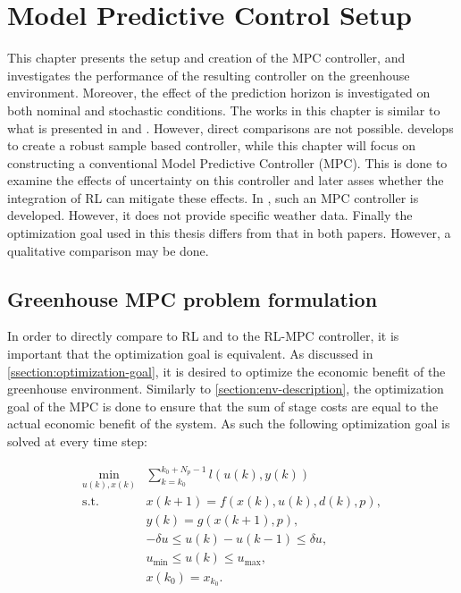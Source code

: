 \chapter{Model Predictive Control Setup}
\label{chapter:MPC}
This chapter presents the setup and creation of the MPC controller, and investigates the performance of the resulting controller on the greenhouse environment. Moreover, the effect of the prediction horizon is investigated on both nominal and stochastic conditions. The works in this chapter is similar to what is presented in \cite{boersmaRobustSamplebasedModel2022} and \cite{morcegoReinforcementLearningModel2023}. However, direct comparisons are not possible. \cite{boersmaRobustSamplebasedModel2022} develops to create a robust sample based controller, while this chapter will focus on constructing a conventional Model Predictive Controller (MPC). This is done to examine the effects of uncertainty on this controller and later asses whether the integration of RL can mitigate these effects. In \cite{morcegoReinforcementLearningModel2023}, such an MPC controller is developed. However, it does not provide specific weather data. Finally the optimization goal used in this thesis differs from that in both papers. However, a qualitative comparison may be done.




\section{Greenhouse MPC problem formulation}
In order to directly compare to RL and to the RL-MPC controller, it is important that the optimization goal is equivalent. As discussed in \autoref{ssection:optimization-goal}, it is desired to optimize the economic benefit of the greenhouse environment. Similarly to \autoref{section:env-description}, the optimization goal of the MPC is done to ensure that the sum of stage costs are equal to the actual economic benefit of the system. As such the following optimization goal is solved at every time step:

\begin{subequations} \label{eq:mpc_ocp}
	\begin{align}
		\min_{u(k),x(k)} & \sum_{k = k_0}^{k_0 + N_p-1} {l(u(k), y(k))} \\
		\text{s.t.} \quad & x(k+1) = f(x(k), u(k), d(k), p),  \label{eq:constraint-1} \\
		& y(k) = g(x(k+1), p), \label{eq:constraint-dynamics} \\
		& -\delta u \leq u(k) - u(k-1) \leq \delta u, \label{eq:constraint-delta-u} \\
		& u_{\min} \leq u(k) \leq u_{\max}, \label{eq:constraint-u-limits}\\
		& x(k_0) = x_{k_0}. \label{eq:constraint-initial}
	\end{align}
\end{subequations}

